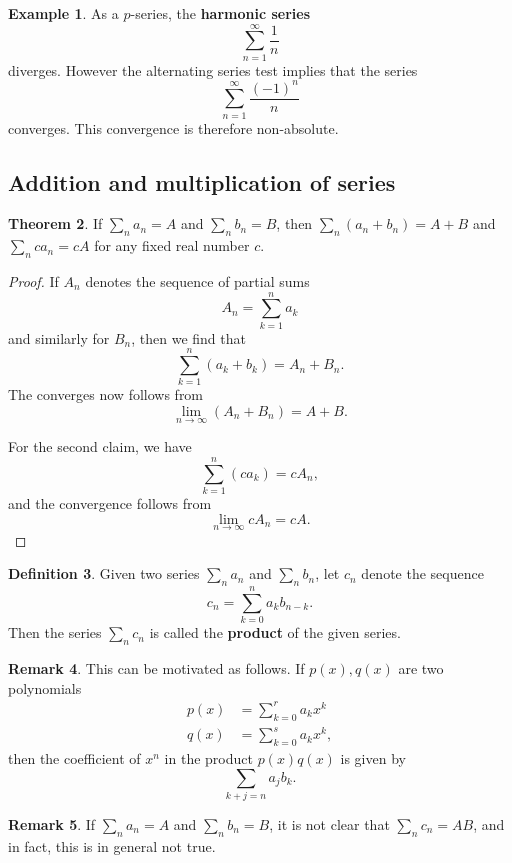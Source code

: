 \documentclass[12pt]{article}
\theoremstyle{definition}
\newtheorem{definition}{Definition}
\newtheorem{example}[definition]{Example}
\newtheorem{remark}[definition]{Remark}
\theoremstyle{theorem}
\newtheorem{theorem}[definition]{Theorem}
\begin{document}
\begin{example}
As a $p$-series, the \textbf{harmonic series}
\[
\sum_{n=1}^\infty \frac{1}{n}
\]
diverges. However the alternating series test implies that the series 
\[
\sum_{n=1}^\infty \frac{(-1)^n}{n}
\]
converges. This convergence is therefore non-absolute. 
\end{example}


\subsection{Addition and multiplication of series}

\begin{theorem}
If $\sum_n a_n = A$ and $\sum_n b_n = B$, then $\sum_n (a_n + b_n) = A + B$ and $\sum_n c a_n = cA$ for any fixed real number $c$. 
\end{theorem}

\begin{proof}
If $A_n$ denotes the sequence of partial sums 
\[
A_n = \sum_{k=1}^n a_k
\]
and similarly for $B_n$, then we find that 
\[
\sum_{k=1}^n (a_k + b_k) = A_n + B_n.
\]
The converges now follows from 
\[
\lim_{n \to \infty}(A_n + B_n) = A + B.
\]

For the second claim, we have 
\[
\sum_{k=1}^n (ca_k) = c A_n,
\]
and the convergence follows from 
\[
\lim_{n \to \infty}c A_n = c A. 
\]
\end{proof}

\begin{definition}
Given two series $\sum_n a_n$ and $\sum_n b_n$, let $c_n$ denote the sequence 
\[
c_n = \sum_{k=0}^n a_k b_{n-k}. 
\]
Then the series $\sum_n c_n$ is called the \textbf{product} of the given series. 
\end{definition}

\begin{remark}
This can be motivated as follows. If $p(x), q(x)$ are two polynomials 
\begin{align*}
p(x) &= \sum_{k=0}^r a_k x^k \\
q(x) &= \sum_{k=0}^s a_k x^k,
\end{align*}
then the coefficient of $x^n$ in the product $p(x)q(x)$ is given by 
\[
\sum_{k + j = n}a_j b_k.
\]
\end{remark}

\begin{remark}
If $\sum_n a_n = A$ and $\sum_n b_n = B$, it is not clear that $\sum_n c_n = AB$, and in fact, this is in general not true. 
\end{remark}
\end{document}

